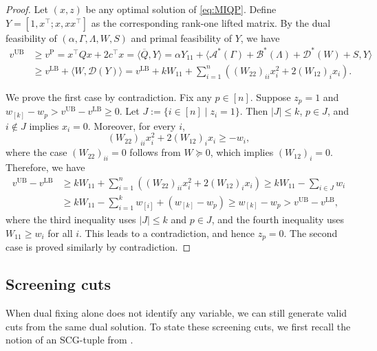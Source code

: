 \documentclass[11pt]{article}
\def\D{\mathcal{D}}
\def\A{\mathcal{A}}
\def\B{\mathcal{B}}
\def\bQ{\overline{Q}}
\theoremstyle{plain}
\begin{document}
\begin{proof}\;
Let $(x,z)$ be any optimal solution of \eqref{eq:MIQP}. Define $Y=[1, x^\top; x, xx^\top] $ as the corresponding rank-one lifted matrix.  
By the dual feasibility of $(\alpha, \Gamma, \Lambda, W, S)$ and primal feasibility of $Y$, we have
\begin{align*}
v^{\mathrm{UB}} 
&\ge v^{\mathrm{P}} 
= x^\top Q x + 2c^\top x 
= \langle \bQ, Y \rangle 
= \alpha Y_{11}+\langle\A^*(\Gamma)+\B^*(\Lambda)+\D^*(W)+S,Y\rangle\\
&\ge v^{\mathrm{LB}}+\langle W,\D(Y)\rangle
=v^{\mathrm{LB}}+kW_{11}
+\sum_{i=1}^n\left((W_{22})_{ii}x_i^2+2(W_{12})_i x_i\right).
\end{align*} 

	 We prove the first case by contradiction.
	 Fix any $p\in[n]$.
Suppose $z_p=1$ and $w_{[k]}-w_p> v^{\mathrm{UB}}-v^{\mathrm{LB}}\geq 0$. 
Let \(J:=\{i\in[n]\mid z_i=1\}\). Then \(|J|\le k\), \(p\in J\), and \(i\notin J\) implies \(x_i=0\). Moreover, for every \(i\),
\[
(W_{22})_{ii}x_i^2+2(W_{12})_i x_i\ge -w_i,
\]
where the case \((W_{22})_{ii}=0\) follows from \(W\succeq0\), which implies \((W_{12})_i=0\).
Therefore, we have
\begin{align*}
v^{\mathrm{UB}} - v^{\mathrm{LB}}
&\geq k W_{11}+\sum_{i=1}^n\left((W_{22})_{ii}x_i^2+2(W_{12})_i x_i\right)
\geq k W_{11}-\sum_{i\in J}w_i\\
&\geq k W_{11}-\sum_{i=1}^{k} w_{[i]}+(w_{[k]}-w_p)
\geq w_{[k]}-w_p>v^{\mathrm{UB}}-v^{\mathrm{LB}},
\end{align*}
where the third inequality uses \(|J|\le k\) and \(p\in J\), and the fourth inequality uses \(W_{11}\geq w_i\) for all \(i\). This leads to a contradiction, and hence $z_p=0$. The second case is proved similarly by contradiction.
\end{proof}





\subsection{Screening cuts}\label{subsec:screening-cuts}

When dual fixing alone does not identify any variable, we can still generate valid cuts from the same dual solution. To state these screening cuts, we first recall the notion of an SCG-tuple from \cite{tan2025screening}.
\end{document}
